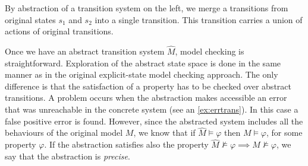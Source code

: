 \begin{example} \label{ex:errtrans}
By abstraction of a transition system on the left, we merge a transitions from
original states $s_1$ and $s_2$ into a single transition. This transition
carries a union of actions of original transitions.
\begin{center}
\end{center}
\end{example}


Once we have an abstract transition system $\widehat{M}$, model checking is
straightforward. Exploration of the abstract state space is done in the same
manner as in the original explicit-state model checking approach. The only
difference is that the satisfaction of a property has to be checked over
abstract transitions. A problem occurs when the abstraction makes accessible an
error that was unreachable in the concrete system (see an
\autoref{ex:errtrans}).
In this case a false positive error is found. However, since the abstracted system
includes all the behaviours of the original model $M$, we know that if
$\widehat{M} \models \varphi$ then $M \models \varphi$, for some property
$\varphi$. If the abstraction satisfies also the property $\widehat{M}
\not\models \varphi \implies M \not\models \varphi$, we say that the abstraction
is \emph{precise}.
